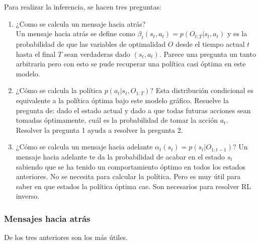  Para realizar la inferencia, se hacen tres preguntas:
 \begin{enumerate}
     \item ¿Como se calcula un mensaje hacia atrás?\\Un mensaje hacia atrás se define como
         $\beta_t(s_t,a_t)=p(O_{t:T}|s_t,a_t)$ y es la probabilidad de que las variables de
         optimalidad $O$ desde el tiempo actual $t$ hasta el final $T$ sean verdaderas dado
         $(s_t,a_t)$. Parece una pregunta un tanto arbitraria pero con esto se pude recuperar
         una política casi óptima en este modelo.
     \item ¿Cómo se calcula la política $p(a_t|s_t,O_{1:T})$? Esta distribución
         condicional es equivalente a la política óptima bajo este modelo gráfico. Resuelve la
         pregunta de: dado el estado actual y dado a que todas futuras acciones sean
         tomadas óptimamente, cuál es la probabilidad de tomar la acción $a_t$.\\Resolver la
         pregunta 1 ayuda a resolver la pregunta 2.
     \item ¿Cómo se calcula un mensaje hacia adelante
         $\alpha_t(s_t)=p(s_t|O_{1:t-1})$? Un mensaje hacia adelante te da la probabilidad de
         acabar en el estado $s_t$ sabiendo que se ha tenido un comportamiento
         óptimo en todos los estados anteriores. No se necesita para calcular la
         política. Pero es muy útil para saber en que estados la política óptima cae. Son
         necesarios para resolver RL inverso.
 \end{enumerate}

 \subsubsection{Mensajes hacia atrás}%
 \label{ssub:mensajes_hacia_atrás}
 
De los tres anteriores son los más útiles.

